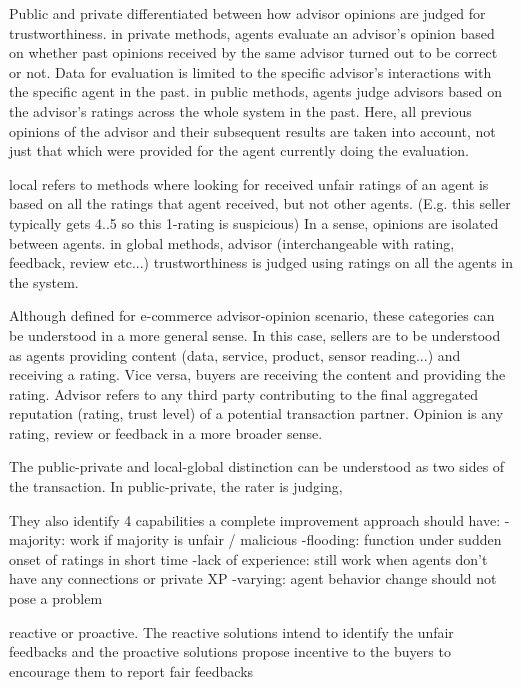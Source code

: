 \documentclass[%
    ]{\PathToTumTemplate/thesis/tum_thesis}
\begin{document}
Public and private differentiated between how advisor opinions are judged for trustworthiness.
in private methods, agents evaluate an advisor's opinion based on whether past opinions received by the same advisor turned out to be correct or not. Data for evaluation is limited to the specific advisor's interactions with the specific agent in the past.
in public methods, agents judge advisors based on the advisor's ratings across the whole system in the past. Here, all previous opinions of the advisor and their subsequent results are taken into account, not just that which were provided for the agent currently doing the evaluation.

local refers to methods where looking for received unfair ratings of an agent is based on all the ratings that agent received, but not other agents. (E.g. this seller typically gets 4..5 so this 1-rating is suspicious) In a sense, opinions are isolated between agents.
in global methods, advisor (interchangeable with rating, feedback, review etc...) trustworthiness is judged using ratings on all the agents in the system.


Although defined for e-commerce advisor-opinion scenario, these categories can be understood in a more general sense. In this case, sellers are to be understood as agents providing content (data, service, product, sensor reading...) and receiving a rating. Vice versa, buyers are receiving the content and providing the rating. Advisor refers to any third party contributing to the final aggregated reputation (rating, trust level) of a potential transaction partner. Opinion is any rating, review or feedback in a more broader sense.

The public-private and local-global distinction can be understood as two sides of the transaction. In public-private, the rater is judging, 

They also identify 4 capabilities a complete improvement approach should have:
-majority: work if majority is unfair / malicious
-flooding: function under sudden onset of ratings in short time
-lack of experience: still work when agents don't have any connections or private XP
-varying: agent behavior change should not pose a problem

reactive or proactive. The reactive solutions intend to identify the unfair feedbacks and the proactive solutions propose incentive to the buyers to encourage them to report fair feedbacks \cite{thakur_reputation_2019}
\end{document}
